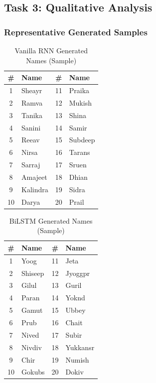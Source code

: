 \documentclass[12pt,a4paper]{article}
\begin{document}
\subsection{Task 3: Qualitative Analysis}

\subsubsection{Representative Generated Samples}

\begin{table}[H]
\centering
\caption{Vanilla RNN Generated Names (Sample)}
\begin{tabular}{@{}clcl@{}}
\toprule
\# & Name & \# & Name \\
\midrule
1 & Sheayr & 11 & Praika \\
2 & Ramva & 12 & Mukish \\
3 & Tanika & 13 & Shina \\
4 & Sanini & 14 & Samir \\
5 & Reeav & 15 & Subdeep \\
6 & Nirsa & 16 & Tarans \\
7 & Sarraj & 17 & Sruen \\
8 & Amajeet & 18 & Dhian \\
9 & Kalindra & 19 & Sidra \\
10 & Darya & 20 & Prail \\
\bottomrule
\end{tabular}
\end{table}

\begin{table}[H]
\centering
\caption{BiLSTM Generated Names (Sample)}
\begin{tabular}{@{}clcl@{}}
\toprule
\# & Name & \# & Name \\
\midrule
1 & Yoog & 11 & Jeta \\
2 & Shiseep & 12 & Jyoggpr \\
3 & Gilul & 13 & Guril \\
4 & Paran & 14 & Yoknd \\
5 & Gamut & 15 & Ubbey \\
6 & Prub & 16 & Chait \\
7 & Nived & 17 & Subir \\
8 & Nivdiv & 18 & Yukkansr \\
9 & Chir & 19 & Numish \\
10 & Gokubs & 20 & Dokiv \\
\bottomrule
\end{tabular}
\end{table}
\end{document}
